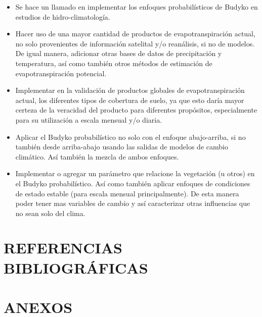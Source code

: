 \documentclass[12pt]{article}
\begin{document}
\begin{itemize}

    \item Se hace un llamado en implementar los enfoques probabilísticos de Budyko en estudios de hidro-climatología.
    
    \item Hacer uso de una mayor cantidad de productos de evapotranspiración actual, no solo provenientes de información satelital y/o reanálisis, si no de modelos. De igual manera, adicionar otras bases de datos de precipitación y temperatura, así como también otros métodos de estimación de evapotranspiración potencial.
    
    \item Implementar en la validación de productos globales de evapotranspiración actual, los diferentes tipos de cobertura de suelo, ya que esto daría mayor certeza de la veracidad del producto para diferentes propósitos, especialmente para su utilización a escala mensual y/o diaria.
    
    \item Aplicar el Budyko probabilístico no solo con el enfoque abajo-arriba, si no también desde arriba-abajo usando las salidas de modelos de cambio climático. Así también la mezcla de ambos enfoques.

    \item Implementar o agregar un parámetro que relacione la vegetación (u otros) en el Budyko probabilístico. Así como también aplicar enfoques de condiciones de estado estable (para escala mensual principalmente). De esta manera poder tener mas variables de cambio y así caracterizar otras influencias que no sean solo del clima.
    
\end{itemize}


\clearpage
\vspace*{0.5mm}
\section{REFERENCIAS BIBLIOGRÁFICAS}




\clearpage
\vspace*{0.5mm}
\section{ANEXOS}
\end{document}
